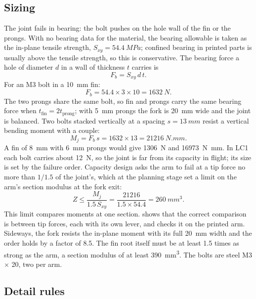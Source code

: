 \subsection{Sizing}

The joint fails in bearing: the bolt pushes on the hole wall of the fin or the prongs. With no bearing data for the material, the bearing allowable is taken as the in-plane tensile strength, $S_{xy} = \SI{54.4}{MPa}$; confined bearing in printed parts is usually above the tensile strength, so this is conservative. The bearing force a hole of diameter $d$ in a wall of thickness $t$ carries is
\begin{equation}
F_b = S_{xy}\, d\, t.
\end{equation}
For an M3 bolt in a \SI{10}{mm} fin:
\begin{equation}
F_b = 54.4 \times 3 \times 10 = \SI{1632}{N}.
\end{equation}
The two prongs share the same bolt, so fin and prongs carry the same bearing force when $t_\text{fin} = 2t_\text{prong}$; with \SI{5}{mm} prongs the fork is \SI{20}{mm} wide and the joint is balanced. Two bolts stacked vertically at a spacing $s = \SI{13}{mm}$ resist a vertical bending moment with a couple:
\begin{equation}
M_j = F_b\, s = 1632 \times 13 = \SI{21216}{N.mm}.
\end{equation}
A fin of \SI{8}{mm} with \SI{6}{mm} prongs would give \SI{1306}{N} and \SI{16973}{N.mm}. In LC1 each bolt carries about \SI{12}{N}, so the joint is far from its capacity in flight; its size is set by the failure order. Capacity design asks the arm to fail at a tip force no more than $1/1.5$ of the joint's, which at the planning stage set a limit on the arm's section modulus at the fork exit:
\begin{equation}
Z \leq \frac{M_j}{1.5\, S_{xy}} = \frac{21216}{1.5 \times 54.4} = \SI{260}{mm^3}.
\end{equation}
This limit compares moments at one section.  shows that the correct comparison is between tip forces, each with its own lever, and checks it on the printed arm. Sideways, the fork resists the in-plane moment with its full \SI{20}{mm} width and the order holds by a factor of 8.5. The fin root itself must be at least 1.5 times as strong as the arm, a section modulus of at least \SI{390}{mm^3}. The bolts are steel M3 $\times$ 20, two per arm.

\subsection{Detail rules}

